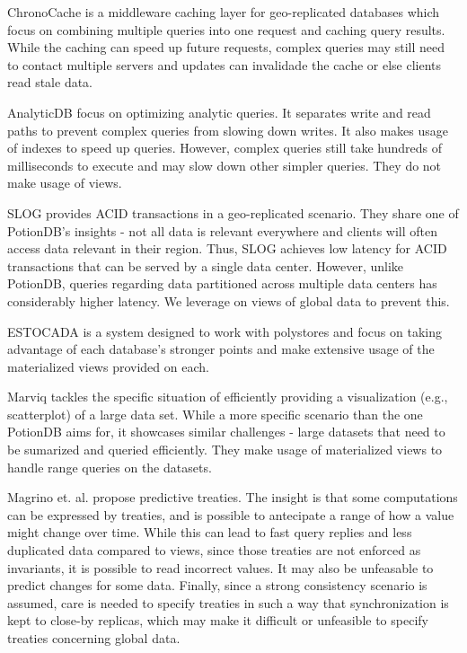 \documentclass[sigplan,review,anonymous]{acmart}
\begin{document}
ChronoCache \cite{chronocache} is a middleware caching layer for geo-replicated databases which focus on combining multiple queries into one request and caching query results.
While the caching can speed up future requests, complex queries may still need to contact multiple servers and updates can invalidade the cache or else clients read stale data.

AnalyticDB \cite{analyticdb} focus on optimizing analytic queries. 
It separates write and read paths to prevent complex queries from slowing down writes. 
It also makes usage of indexes to speed up queries.
However, complex queries still take hundreds of milliseconds to execute and may slow down other simpler queries.
They do not make usage of views.

SLOG \cite{slog} provides ACID transactions in a geo-replicated scenario.
They share one of PotionDB's insights - not all data is relevant everywhere and clients will often access data relevant in their region.
Thus, SLOG achieves low latency for ACID transactions that can be served by a single data center.
However, unlike PotionDB, queries regarding data partitioned across multiple data centers has considerably higher latency.
We leverage on views of global data to prevent this.

ESTOCADA \cite{estocada} is a system designed to work with polystores and focus on taking advantage of each database's stronger points and make extensive usage of the materialized views provided on each.

Marviq \cite{marviq} tackles the specific situation of efficiently providing a visualization (e.g., scatterplot) of a large data set.
While a more specific scenario than the one PotionDB aims for, it showcases similar challenges - large datasets that need to be sumarized and queried efficiently.
They make usage of materialized views to handle range queries on the datasets.

Magrino et. al. \cite{treaties} propose predictive treaties. 
The insight is that some computations can be expressed by treaties, and is possible to antecipate a range of how a value might change over time.
While this can lead to fast query replies and less duplicated data compared to views, since those treaties are not enforced as invariants, it is possible to read incorrect values.
It may also be unfeasable to predict changes for some data.
Finally, since a strong consistency scenario is assumed, care is needed to specify treaties in such a way that synchronization is kept to close-by replicas, which may make it difficult or unfeasible to specify treaties concerning global data.
\end{document}
